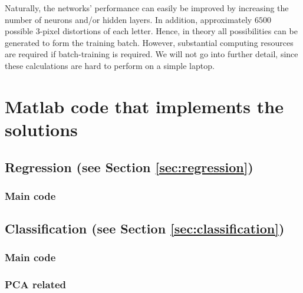 \documentclass[pdftex,11pt,a4paper]{article}
\begin{document}
Naturally, the networks' performance can easily be improved by increasing the number of neurons and/or hidden layers. In addition, approximately $6500$ possible 3-pixel distortions of each letter. Hence, in theory all possibilities can be generated to form the training batch. However, substantial computing resources are required if batch-training is required. We will not go into further detail, since these calculations are hard to perform on a simple laptop.


\newpage
\appendix

%

\section{Matlab code that implements the solutions}
\subsection{Regression (see Section \ref{sec:regression})}
\subsubsection{Main code}

\subsection{Classification (see Section \ref{sec:classification})}
\subsubsection{Main code}

\subsubsection{PCA related}

\end{document}
